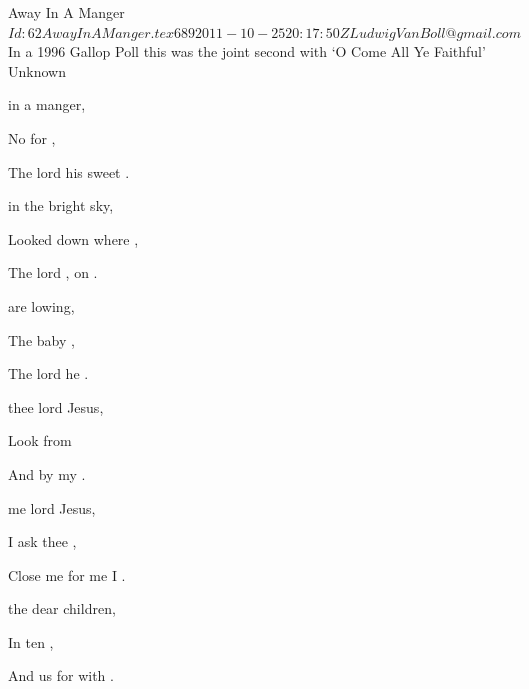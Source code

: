 \begin{SBSong}{Away In A Manger}  
    {$Id: 62AwayInAManger.tex 689 2011-10-25 20:17:50Z LudwigVanBoll@gmail.com $}
    {In a 1996 Gallop Poll this was the joint second with `O Come All Ye Faithful'}
    {Unknown}
  \begin{SBVerse}
	 in a manger,
	
	No  for  ,
	
	The  lord    his sweet .
	
	  in the bright sky,
	
	Looked down where  ,
	
	The  lord ,  on  .
  \end{SBVerse}
  \begin{SBVerse}
	  are lowing,
	
	The baby ,
	
	The  lord    he .
	
	  thee lord Jesus,
	
	Look  from  
	
	And  by my     .
  \end{SBVerse}
  \begin{SBVerse}
	  me lord Jesus,
	
	I ask thee  ,
	
	Close  me for    me I .
	
	  the dear children,
	
	In  ten ,
	
	And  us for    with  .
  \end{SBVerse}
\end{SBSong}
